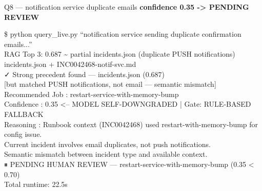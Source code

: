\begin{frame}{Q8 — notification service duplicate emails}
  {\color{camber}\ttfamily\small\bfseries confidence 0.35 -> PENDING REVIEW}
  \vspace{0.15cm}
  \begin{terminal}
    \$ python query\_live.py ``notification service sending duplicate confirmation emails...''\\

    RAG Top 3: {\color{cauto}0.687 \textasciitilde{} partial}  incidents.json  (duplicate PUSH notifications)\\
      incidents.json + INC0042468-notif-svc.md\\

    ✓ Strong precedent found — incidents.json (0.687)\\
    \hspace*{0.4cm}[but matched PUSH notifications, not email — semantic mismatch]\\

    Recommended Job : {\color{camber}restart-service-with-memory-bump}\\
    Confidence      : {\color{camber}0.35  <-- MODEL SELF-DOWNGRADED}  |  Gate: {\color{camber}RULE-BASED FALLBACK}\\
    Reasoning       : Runbook context (INC0042468) used restart-with-memory-bump for config issue.\\
    \hspace*{0.4cm}Current incident involves email duplicates, not push notifications.\\
    \hspace*{0.4cm}Semantic mismatch between incident type and available context.\\

    {\color{camber}⏸  PENDING HUMAN REVIEW  —  restart-service-with-memory-bump  (0.35 < 0.70)}\\
    Total runtime: 22.5s
  \end{terminal}
\end{frame}

